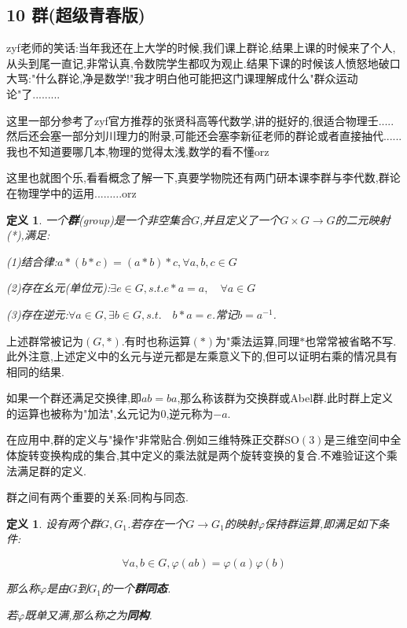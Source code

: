 \documentclass[UTF8]{article}
\begin{document}
	\newpage
	
	
	
	
	
\subsection*{10 群(超级青春版)}
	
	zyf老师的笑话:当年我还在上大学的时候,我们课上群论,结果上课的时候来了个人,从头到尾一直记,非常认真,令数院学生都叹为观止.结果下课的时候该人愤怒地破口大骂:"什么群论,净是数学!"我才明白他可能把这门课理解成什么"群众运动论"了.........

	这里一部分参考了zyf官方推荐的张贤科高等代数学,讲的挺好的,很适合物理壬.....然后还会塞一部分刘川理力的附录,可能还会塞李新征老师的群论或者直接抽代......我也不知道要哪几本,物理的觉得太浅,数学的看不懂orz
	
	这里也就图个乐,看看概念了解一下,真要学物院还有两门研本课李群与李代数,群论在物理学中的运用.........orz
	
	\newtheorem*{Group}{定义}
	
	\begin{Group}
		
		一个\textbf{群}(group)是一个非空集合$G$,并且定义了一个$G \times G \to G$的二元映射(*),满足:
		
		(1)结合律:$a * (b * c) = (a * b) * c, \forall a,b,c \in G$
		
		(2)存在幺元(单位元):$\exists e \in G, s.t. e * a = a, \quad \forall a \in G$
		
		(3)存在逆元:$\forall a \in G, \exists b \in G, s.t. \quad b * a = e$.常记$b = a^{-1}$.
		
	\end{Group}
	
	上述群常被记为$(G , *)$.有时也称运算$(*)$为"乘法运算,同理$*$也常常被省略不写.此外注意,上述定义中的幺元与逆元都是左乘意义下的,但可以证明右乘的情况具有相同的结果.
	
	如果一个群还满足交换律,即$ab=ba$,那么称该群为交换群或Abel群.此时群上定义的运算也被称为"加法",幺元记为$0$,逆元称为$-a$.
	
	在应用中,群的定义与"操作"非常贴合.例如三维特殊正交群$\mathrm{SO(3)}$是三维空间中全体旋转变换构成的集合,其中定义的乘法就是两个旋转变换的复合.不难验证这个乘法满足群的定义.
	
	群之间有两个重要的关系:同构与同态.
	
	\newtheorem*{homomorphism}{定义}
	
	\begin{homomorphism}
		
		设有两个群$G,G_1$.若存在一个$G \to G_1$的映射$\varphi$保持群运算,即满足如下条件:
		
		\[\forall a,b \in G, \varphi(ab) = \varphi(a) \varphi(b) \]
		
		那么称$\varphi$是由$G$到$G_1$的一个\textbf{群同态}.
		
		若$\varphi$既单又满,那么称之为\textbf{同构}.
		
	\end{homomorphism}
	
\end{document}
